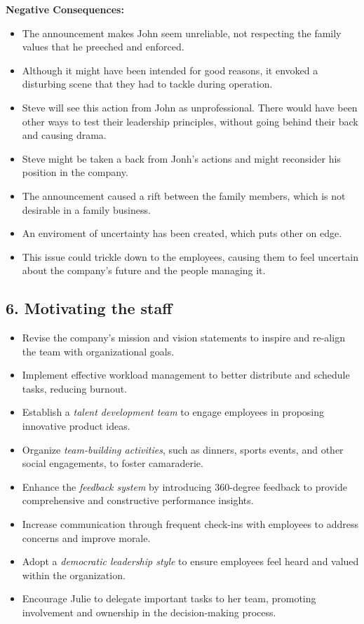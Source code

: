 \documentclass[a4paper,10pt]{article}
\begin{document}
\textbf{Negative Consequences:}
\begin{itemize}
    \item The announcement makes John seem unreliable, not respecting the family values that he preeched and enforced.
    \item Although it might have been intended for good reasons, it envoked a disturbing scene that they had to tackle during operation.
    \item Steve will see this action from John as unprofessional. There would have been other ways to test their leadership principles, without going behind their back and causing drama.
    \item Steve might be taken a back from Jonh's actions and might reconsider his position in the company.
    \item The announcement caused a rift between the family members, which is not desirable in a family business.
    \item An enviroment of uncertainty has been created, which puts other on edge.
    \item This issue could trickle down to the employees, causing them to feel uncertain about the company's future and the people managing it.
\end{itemize}

\subsection{6. Motivating the staff}

\begin{itemize}
    \item Revise the company’s mission and vision statements to inspire and re-align the team with organizational goals.
    \item Implement effective workload management to better distribute and schedule tasks, reducing burnout.
    \item Establish a \textit{talent development team} to engage employees in proposing innovative product ideas.
    \item Organize \textit{team-building activities}, such as dinners, sports events, and other social engagements, to foster camaraderie.
    \item Enhance the \textit{feedback system} by introducing 360-degree feedback to provide comprehensive and constructive performance insights.
    \item Increase communication through frequent check-ins with employees to address concerns and improve morale.
    \item Adopt a \textit{democratic leadership style} to ensure employees feel heard and valued within the organization.
    \item Encourage Julie to delegate important tasks to her team, promoting involvement and ownership in the decision-making process.
\end{itemize}
\end{document}
